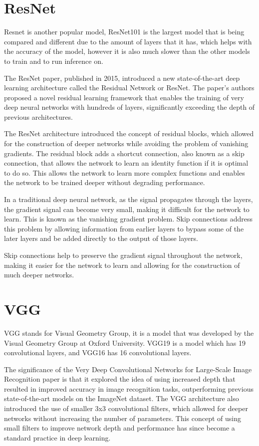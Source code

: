 \documentclass[]{final_report}
\begin{document}
\section{ResNet}
Resnet\cite{DBLP:journals/corr/HeZRS15} is another popular model, ResNet101 is the largest model that is being compared and different due to the amount of layers that it has, which helps with the accuracy of the model, however it is also much slower than the other models to train and to run inference on.

The ResNet paper\cite{DBLP:journals/corr/HeZRS15}, published in 2015, introduced a new state-of-the-art deep learning architecture called the Residual Network or ResNet. The paper's authors proposed a novel residual learning framework that enables the training of very deep neural networks with hundreds of layers, significantly exceeding the depth of previous architectures.

The ResNet architecture introduced the concept of residual blocks, which allowed for the construction of deeper networks while avoiding the problem of vanishing gradients. The residual block adds a shortcut connection, also known as a skip connection, that allows the network to learn an identity function if it is optimal to do so. This allows the network to learn more complex functions and enables the network to be trained deeper without degrading performance.

In a traditional deep neural network, as the signal propagates through the layers, the gradient signal can become very small, making it difficult for the network to learn. This is known as the vanishing gradient problem. Skip connections address this problem by allowing information from earlier layers to bypass some of the later layers and be added directly to the output of those layers.

Skip connections help to preserve the gradient signal throughout the network, making it easier for the network to learn and allowing for the construction of much deeper networks.

\section{VGG}
VGG stands for Visual Geometry Group, it is a model that was developed by the Visual Geometry Group at Oxford University.
VGG19\cite{Simonyan15} is a model which has 19 convolutional layers, and VGG16 has 16 convolutional layers.

The significance of the Very Deep Convolutional Networks for Large-Scale Image Recognition paper\cite{Simonyan15} is that it explored the idea of using increased depth that resulted in improved accuracy in image recognition tasks, outperforming previous state-of-the-art models on the ImageNet dataset.
The VGG architecture also introduced the use of smaller 3x3 convolutional filters, which allowed for deeper networks without increasing the number of parameters. This concept of using small filters to improve network depth and performance has since become a standard practice in deep learning.
\end{document}
